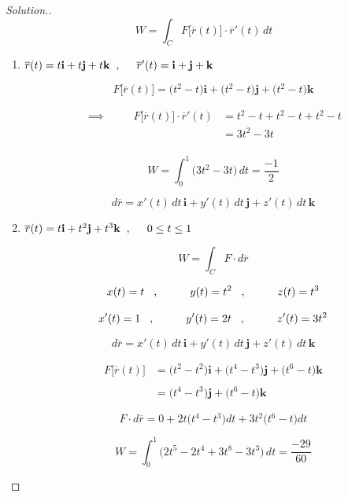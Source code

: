 \documentclass[11pt,a4paper]{article}
\theoremstyle{definition}
\newenvironment{solution}
  {\renewcommand{\qedsymbol}{}\begin{proof}[\textit{Solution}.]}
  {\end{proof}}
\begin{document}
\begin{solution}

$$W = \int_C F\big[\overline{r}(t)\big]\cdot\overline{r}'(t)\, dt$$
\begin{enumerate}
\item[(a).]\hspace{0.3cm}  $\overline{r}(t) = t\textbf{i} + t\textbf{j} + t\textbf{k}\hspace{0.2cm} , \hspace{0.5cm} \overline{r}'(t) = \textbf{i} + \textbf{j} + \textbf{k}$

$$F\big[\overline{r}(t)\big] =\big(t^2 - t\big) \textbf{i} + \big(t^2 - t\big) \textbf{j} + \big(t^2 - t\big) \textbf{k}$$

\begin{align*}
\implies \hspace{1cm} F\big[\overline{r}(t)\big]\cdot \overline{r}'(t) & = t^2 - t + t^2 - t + t^2 - t\\
& = 3t^2 - 3t\\
\end{align*}

$$W = \int^1_0 \big(3t^2 - 3t\big) \,dt = \frac{-1}{2}$$

$$d\overline{r} = x'(t)\,dt\,\textbf{i} + y'(t)\,dt\, \textbf{j} + z'(t)\,dt\,\textbf{k}$$

\item[(b).]\hspace{0.3cm}
$\overline{r}(t) = t\textbf{i} + t^2 \textbf{j} + t^3\textbf{k}\hspace{0.2cm}, \hspace{0.5cm} 0\leq t \leq 1$

$$W = \int_C F\cdot d\overline{r}$$

$$x(t) = t \hspace{0.3cm} , \hspace{1cm} y(t) = t^2\hspace{0.3cm} ,\hspace{1cm} z(t) = t^3$$

$$x'(t) = 1 \hspace{0.3cm} , \hspace{1cm} y'(t) = 2t\hspace{0.3cm} ,\hspace{1cm} z'(t) = 3t^2$$

$$d\overline{r} = x'(t)\,dt\,\textbf{i} + y'(t)\,dt\, \textbf{j} + z'(t)\,dt\,\textbf{k}$$

\begin{align*}
F\big[\overline{r}(t)\big] & = \big(t^2 -t^2\big)\textbf{i} + \big(t^4 - t^3\big)\textbf{j} + \big(t^6 -t\big)\textbf{k}\\\\
& = \big(t^4-t^3\big)\textbf{j} + \big(t^6 - t\big)\textbf{k}
\end{align*}

$$F\cdot d\overline{r} = 0 + 2t\big(t^4-t^3\big) dt + 3t^2\big(t^6-t\big)dt$$

$$W = \int^1_0 \big( 2t^5 - 2t^4 + 3t^8 - 3t^3\big) \,dt = \dfrac{-29}{60}$$
\end{enumerate}

\pagebreak
\end{solution}
\end{document}
